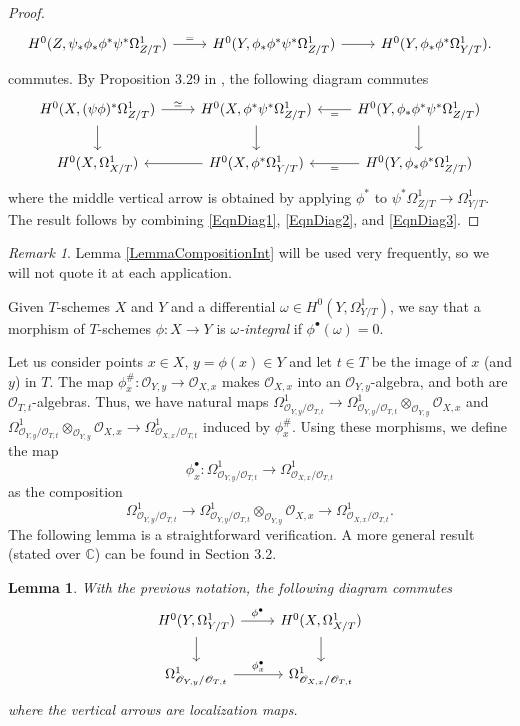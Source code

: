 \documentclass[11pt]{amsart}
\newtheorem{lemma}[theorem]{Lemma}
\theoremstyle{remark}
\newtheorem{remark}[theorem]{Remark}
\numberwithin{equation}{section}
\newcommand{\Ocal}{\mathscr{O}}
\newcommand{\C}{\mathbb{C}}
\begin{document}
\begin{proof}
\begin{equation}
\begin{tikzcd}
H^0(Z,\psi_*\phi_*\phi^*\psi^*\Omega^1_{Z/T})\arrow{r}{=} &H^0(Y,\phi_*\phi^*\psi^*\Omega^1_{Z/T})\arrow{r} & H^0(Y,\phi_*\phi^*\Omega^1_{Y/T}).
\end{tikzcd}
\end{equation}
commutes. By Proposition 3.29 in \cite{GFthesis}, the following diagram commutes
\begin{equation}\label{EqnDiag3}
\begin{tikzcd}
H^0(X,(\psi\phi)^*\Omega^1_{Z/T})\arrow{r}{\simeq} \arrow{d} &H^0(X,\phi^*\psi^*\Omega^1_{Z/T})  \arrow{d}   &H^0(Y,\phi_*\phi^*\psi^*\Omega^1_{Z/T}) \arrow{l}{=} \arrow{d} \\
H^0(X,\Omega^1_{X/T}) &H^0(X,\phi^*\Omega^1_{Y/T}) \arrow{l} &H^0(Y,\phi_*\phi^*\Omega^1_{Z/T}) \arrow{l}{=}
\end{tikzcd}
\end{equation}
where the middle vertical arrow is obtained by applying $\phi^*$ to $\psi^*\Omega^1_{Z/T}\to \Omega^1_{Y/T}$. The result follows by combining \eqref{EqnDiag1}, \eqref{EqnDiag2}, and  \eqref{EqnDiag3}. 
\end{proof}
\begin{remark} Lemma \ref{LemmaCompositionInt} will be used very frequently, so we will not quote it at each application. 
\end{remark}

Given $T$-schemes $X$ and $Y$ and a differential $\omega\in H^0(Y, \Omega^1_{Y/T})$, we say that a morphism of $T$-schemes $\phi:X\to Y$ is \emph{$\omega$-integral} if $\phi^\bullet(\omega)=0$. 



Let us consider points $x\in X$, $y=\phi(x)\in Y$ and let $t\in T$ be the image of $x$ (and $y$) in $T$. The map $\phi^\#_x:\Ocal_{Y,y}\to \Ocal_{X,x}$ makes $\Ocal_{X,x}$ into an $\Ocal_{Y,y}$-algebra, and both are $\Ocal_{T,t}$-algebras. Thus, we have natural maps $\Omega^1_{\Ocal_{Y,y}/\Ocal_{T,t}}\to \Omega^1_{\Ocal_{Y,y}/\Ocal_{T,t}}\otimes_{\Ocal_{Y,y}} \Ocal_{X,x}$ and $ \Omega^1_{\Ocal_{Y,y}/\Ocal_{T,t}}\otimes_{\Ocal_{Y,y}} \Ocal_{X,x}\to  \Omega^1_{\Ocal_{X,x}/\Ocal_{T,t}}$ induced by $\phi^\#_x$. Using these morphisms, we define the map 
$$
\phi^\bullet_x : \Omega^1_{\Ocal_{Y,y}/\Ocal_{T,t}}\to \Omega^1_{\Ocal_{X,x}/\Ocal_{T,t}}
$$
as the composition
$$
\Omega^1_{\Ocal_{Y,y}/\Ocal_{T,t}}\to \Omega^1_{\Ocal_{Y,y}/\Ocal_{T,t}}\otimes_{\Ocal_{Y,y}} \Ocal_{X,x}\to  \Omega^1_{\Ocal_{X,x}/\Ocal_{T,t}}.
$$
The following lemma is a straightforward verification. A more general result (stated over $\C$) can be found in \cite{GFthesis} Section 3.2.
\begin{lemma}\label{LemmaCommLoc} With the previous notation, the following diagram commutes
$$
\begin{tikzcd}
H^0(Y,\Omega^1_{Y/T}) \arrow{d}   \arrow{r}{\phi^\bullet} & H^0(X,\Omega^1_{X/T})\arrow{d}\\
\Omega^1_{\Ocal_{Y,y}/\Ocal_{T,t}} \arrow{r}{\phi^\bullet_x} & \Omega^1_{\Ocal_{X,x}/\Ocal_{T,t}}
\end{tikzcd}
$$
where the vertical arrows are localization maps.
\end{lemma}
\end{document}
